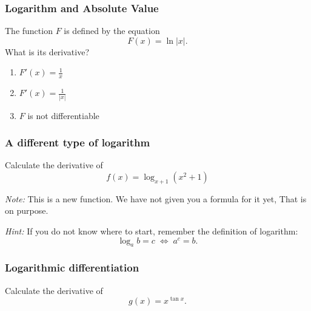 \documentclass[14pt]{beamer}
\begin{document}
\begin{frame}[t]
	\frametitle{Logarithm and Absolute Value}

	The function $F$ is defined by the equation
	\[
		F(x) = \ln |x| .
	\]
	What is its derivative?
	\vfill
	\begin{enumerate}
		\item $\displaystyle F'(x) = \frac{1}{x}$
			\vfill

		\item $\displaystyle F'(x) = \frac{1}{|x|}$
			\vfill

		\item $F$ is not differentiable
			\vfill
	\end{enumerate}
\end{frame}

\begin{frame}[t]
	\frametitle{A different type of logarithm}

	Calculate the derivative of
	\[
		f(x) = \log_{x+1}(x^{2}+1)
	\]

	\vfill

	\emph{Note:} This is a new function. We have not given you a formula for it
	yet, That is on purpose.

	\vfill

	\emph{Hint:} If you do not know where to start, remember the definition of
	logarithm:
	\[
		\log_{a}b = c \; \iff \; a^{c}= b.
	\]
\end{frame}

\begin{frame}[t]
	\frametitle{Logarithmic differentiation}

	\vspace{5mm}
	\begin{block}{}
		Calculate the derivative of
		\[
			g(x) = x^{\tan x}.
		\]
	\end{block}
\end{frame}
\end{document}

